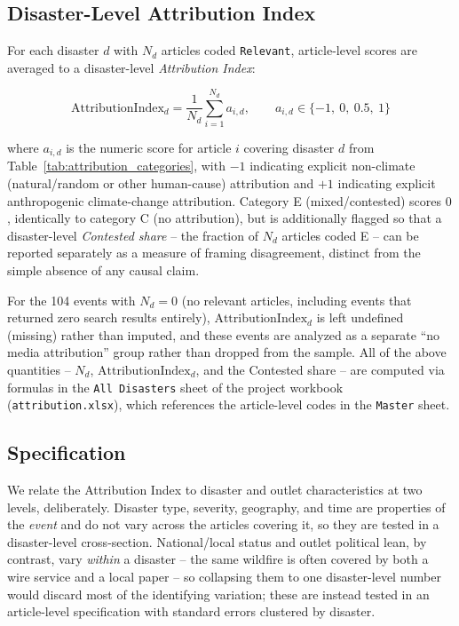 \documentclass[12pt]{article}
\begin{document}
\subsection{Disaster-Level Attribution Index}

For each disaster $d$ with $N_d$ articles coded \texttt{Relevant},
article-level scores are averaged to a disaster-level
\emph{Attribution Index}:

\begin{equation}
\text{AttributionIndex}_{d} = \frac{1}{N_d}\sum_{i=1}^{N_d} a_{i,d},
\qquad a_{i,d} \in \{-1,\ 0,\ 0.5,\ 1\}
\label{eq:attribution_index}
\end{equation}

where $a_{i,d}$ is the numeric score for article $i$ covering disaster
$d$ from Table~\ref{tab:attribution_categories}, with $-1$ indicating
explicit non-climate (natural/random or other human-cause) attribution
and $+1$ indicating explicit anthropogenic climate-change attribution.
Category E (mixed/contested) scores $0$, identically to category C (no
attribution), but is additionally flagged so that a disaster-level
\emph{Contested share} -- the fraction of $N_d$ articles coded E -- can
be reported separately as a measure of framing disagreement, distinct
from the simple absence of any causal claim.

For the 104 events with $N_d = 0$ (no relevant articles, including
events that returned zero search results entirely),
$\text{AttributionIndex}_d$ is left undefined (missing) rather than
imputed, and these events are analyzed as a separate ``no media
attribution'' group rather than dropped from the sample. All of the
above quantities -- $N_d$, $\text{AttributionIndex}_d$, and the
Contested share -- are computed via formulas in the \texttt{All
Disasters} sheet of the project workbook (\texttt{attribution.xlsx}),
which references the article-level codes in the \texttt{Master}
sheet.

\subsection{Specification}
\label{sec:specification}

We relate the Attribution Index to disaster and outlet characteristics at
two levels, deliberately. Disaster type, severity, geography, and time are
properties of the \emph{event} and do not vary across the articles covering
it, so they are tested in a disaster-level cross-section. National/local
status and outlet political lean, by contrast, vary \emph{within} a
disaster -- the same wildfire is often covered by both a wire service and a
local paper -- so collapsing them to one disaster-level number would
discard most of the identifying variation; these are instead tested in an
article-level specification with standard errors clustered by disaster.
\end{document}
